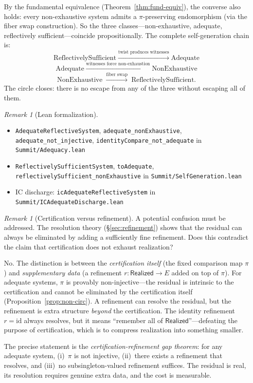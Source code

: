 \documentclass[11pt,a4paper]{article}
\theoremstyle{plain}
\theoremstyle{definition}
\theoremstyle{remark}
\newtheorem{remark}[theorem]{Remark}
\newcommand{\Real}{\mathsf{Realized}}
\newcommand{\compare}{\pi}
\begin{document}
By the fundamental equivalence (Theorem~\ref{thm:fund-equiv}), the converse
also holds: every non-exhaustive system admits a $\compare$-preserving
endomorphism (via the fiber swap construction). So the three
classes---non-exhaustive, adequate, reflectively sufficient---coincide
propositionally. The complete self-generation chain is:
\[
  \text{ReflectivelySufficient}
  \;\xrightarrow{\text{twist produces witnesses}}\;
  \text{Adequate}
\]
\[
  \text{Adequate}
  \;\xrightarrow{\text{witnesses force non-exhaustion}}\;
  \text{NonExhaustive}
\]
\[
  \text{NonExhaustive}
  \;\xrightarrow{\text{fiber swap}}\;
  \text{ReflectivelySufficient}.
\]
The circle closes: there is no escape from any of the three without escaping
all of them.

\begin{remark}[Lean formalization]
\leavevmode\par\begin{itemize}[nosep,leftmargin=*,before=\raggedright]
\item \texttt{AdequateReflectiveSystem}, \texttt{adequate\_nonExhaustive}, \texttt{adequate\_not\_injective}, \texttt{identityCompare\_not\_adequate} in \texttt{Summit/Adequacy.lean}
\item \texttt{ReflectivelySufficientSystem}, \texttt{toAdequate}, \texttt{reflectivelySufficient\_\allowbreak{}nonExhaustive} in \texttt{Summit/SelfGeneration.lean}
\item IC discharge: \texttt{icAdequateReflectiveSystem} in \texttt{Summit/ICAdequateDischarge.lean}
\end{itemize}
\end{remark}

\begin{remark}[Certification versus refinement]\label{rem:cert-vs-refine}
A potential confusion must be addressed. The resolution theory
(\S\ref{sec:refinement}) shows that the residual can always be eliminated
by adding a sufficiently fine refinement. Does this contradict the claim
that certification does not exhaust realization?

No. The distinction is between the \emph{certification itself} (the fixed
comparison map $\compare$) and \emph{supplementary data} (a refinement
$r : \Real \to E$ added on top of $\compare$). For adequate systems,
$\compare$ is provably non-injective---the residual is intrinsic to the
certification and cannot be eliminated by the certification itself
(Proposition~\ref{prop:non-circ}). A refinement can resolve the residual,
but the refinement is extra structure \emph{beyond} the certification.
The identity refinement $r = \mathrm{id}$ always resolves, but it means
``remember all of $\Real$''---defeating the purpose of certification,
which is to compress realization into something smaller.

The precise statement is the \emph{certification-refinement gap theorem}:
for any adequate system, (i)~$\compare$ is not injective, (ii)~there
exists a refinement that resolves, and (iii)~no subsingleton-valued
refinement suffices. The residual is real, its resolution requires
genuine extra data, and the cost is measurable.
\end{remark}
\end{document}
